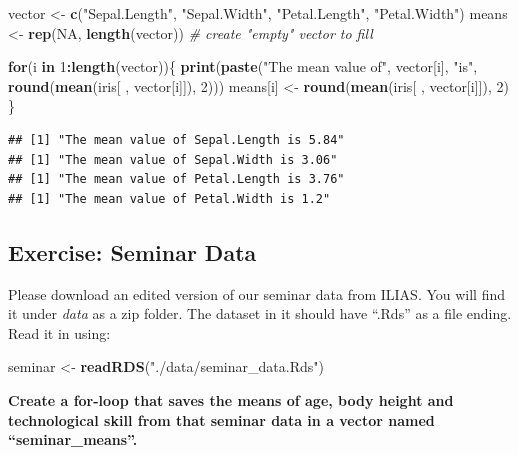 \documentclass[
]{book}
\newenvironment{Shaded}{\begin{snugshade}}{\end{snugshade}}
\newcommand{\CommentTok}[1]{\textcolor[rgb]{0.56,0.35,0.01}{\textit{#1}}}
\newcommand{\ConstantTok}[1]{\textcolor[rgb]{0.56,0.35,0.01}{#1}}
\newcommand{\ControlFlowTok}[1]{\textcolor[rgb]{0.13,0.29,0.53}{\textbf{#1}}}
\newcommand{\DecValTok}[1]{\textcolor[rgb]{0.00,0.00,0.81}{#1}}
\newcommand{\FunctionTok}[1]{\textcolor[rgb]{0.13,0.29,0.53}{\textbf{#1}}}
\newcommand{\NormalTok}[1]{#1}
\newcommand{\OtherTok}[1]{\textcolor[rgb]{0.56,0.35,0.01}{#1}}
\newcommand{\SpecialCharTok}[1]{\textcolor[rgb]{0.81,0.36,0.00}{\textbf{#1}}}
\newcommand{\StringTok}[1]{\textcolor[rgb]{0.31,0.60,0.02}{#1}}
\begin{document}
\begin{Shaded}
\begin{Highlighting}[]
\NormalTok{vector }\OtherTok{\textless{}{-}} \FunctionTok{c}\NormalTok{(}\StringTok{"Sepal.Length"}\NormalTok{, }\StringTok{"Sepal.Width"}\NormalTok{, }\StringTok{"Petal.Length"}\NormalTok{, }\StringTok{"Petal.Width"}\NormalTok{)}
\NormalTok{means }\OtherTok{\textless{}{-}} \FunctionTok{rep}\NormalTok{(}\ConstantTok{NA}\NormalTok{, }\FunctionTok{length}\NormalTok{(vector)) }\CommentTok{\# create "empty" vector to fill}

\ControlFlowTok{for}\NormalTok{(i }\ControlFlowTok{in} \DecValTok{1}\SpecialCharTok{:}\FunctionTok{length}\NormalTok{(vector))\{}
  \FunctionTok{print}\NormalTok{(}\FunctionTok{paste}\NormalTok{(}\StringTok{"The mean value of"}\NormalTok{, vector[i], }\StringTok{"is"}\NormalTok{, }
              \FunctionTok{round}\NormalTok{(}\FunctionTok{mean}\NormalTok{(iris[ , vector[i]]), }\DecValTok{2}\NormalTok{)))}
\NormalTok{  means[i] }\OtherTok{\textless{}{-}} \FunctionTok{round}\NormalTok{(}\FunctionTok{mean}\NormalTok{(iris[ , vector[i]]), }\DecValTok{2}\NormalTok{)}
\NormalTok{\}}
\end{Highlighting}
\end{Shaded}

\begin{verbatim}
## [1] "The mean value of Sepal.Length is 5.84"
## [1] "The mean value of Sepal.Width is 3.06"
## [1] "The mean value of Petal.Length is 3.76"
## [1] "The mean value of Petal.Width is 1.2"
\end{verbatim}

\subsection{Exercise: Seminar Data}\label{exercise-seminar-data}

Please download an edited version of our seminar data from ILIAS. You will find it under \emph{data} as a zip folder. The dataset in it should have ``.Rds'' as a file ending. Read it in using:

\begin{Shaded}
\begin{Highlighting}[]
\NormalTok{seminar }\OtherTok{\textless{}{-}} \FunctionTok{readRDS}\NormalTok{(}\StringTok{"./data/seminar\_data.Rds"}\NormalTok{)}
\end{Highlighting}
\end{Shaded}

\textbf{Create a for-loop that saves the means of age, body height and technological skill from that seminar data in a vector named ``seminar\_means''.}
\end{document}
